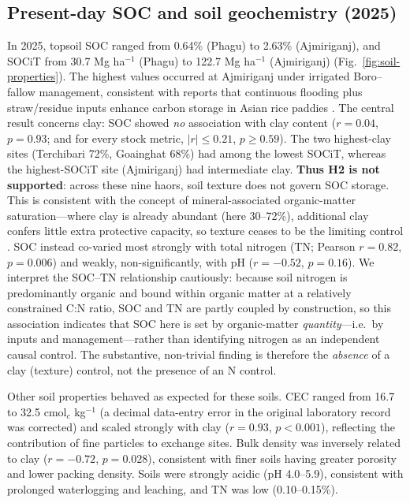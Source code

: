 \documentclass[preprint,authoryear,12pt]{elsarticle}
\begin{document}
\subsection{Present-day SOC and soil geochemistry (2025)}
\label{subsec:soc-2025}
In 2025, topsoil SOC ranged from 0.64\% (Phagu) to 2.63\% (Ajmiriganj), and SOCiT from
30.7 Mg ha$^{-1}$ (Phagu) to 122.7 Mg ha$^{-1}$ (Ajmiriganj) (Fig.~\ref{fig:soil-properties}).
The highest values occurred at Ajmiriganj under irrigated Boro--fallow management, consistent
with reports that continuous flooding plus straw/residue inputs enhance carbon storage in
Asian rice paddies \citep{Chen2021}.
The central result concerns clay: SOC showed \emph{no} association with clay content
($r=0.04$, $p=0.93$; and for every stock metric, $|r|\leq0.21$, $p\geq0.59$). The two
highest-clay sites (Terchibari 72\%, Goainghat 68\%) had among the lowest SOCiT, whereas the
highest-SOCiT site (Ajmiriganj) had intermediate clay. \textbf{Thus H2 is not supported}: across
these nine haors, soil texture does not govern SOC storage. This is consistent with the concept
of mineral-associated organic-matter saturation---where clay is already abundant (here 30--72\%),
additional clay confers little extra protective capacity, so texture ceases to be the limiting
control \citep[e.g.][]{Cotrufo2019,Georgiou2022}. SOC instead co-varied most strongly with total
nitrogen (TN; Pearson $r=0.82$, $p=0.006$) and weakly, non-significantly, with pH ($r=-0.52$,
$p=0.16$). We interpret the SOC--TN relationship cautiously: because soil nitrogen is
predominantly organic and bound within organic matter at a relatively constrained C:N ratio,
SOC and TN are partly coupled by construction, so this association indicates that SOC here is set
by organic-matter \emph{quantity}---i.e.\ by inputs and management---rather than identifying
nitrogen as an independent causal control. The substantive, non-trivial finding is therefore the
\emph{absence} of a clay (texture) control, not the presence of an N control.

Other soil properties behaved as expected for these soils. CEC ranged from 16.7 to 32.5
cmol$_c$ kg$^{-1}$ (a decimal data-entry error in the original laboratory record was corrected)
and scaled strongly with clay ($r=0.93$, $p<0.001$), reflecting the contribution of fine particles
to exchange sites. Bulk density was inversely related to clay
($r=-0.72$, $p=0.028$), consistent with finer soils having greater porosity and lower packing
density. Soils were strongly acidic (pH 4.0--5.9),
consistent with prolonged waterlogging and leaching, and TN was low (0.10--0.15\%).
\end{document}
